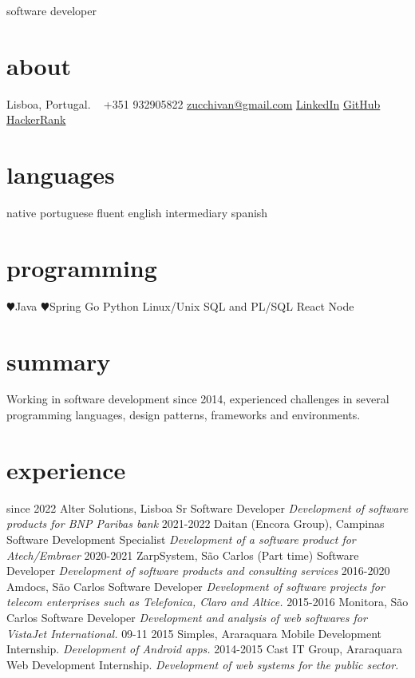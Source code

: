 \documentclass[]{friggeri-cv}
\begin{document}
       {software developer}


\begin{aside}
  \section{about}
    Lisboa,
    Portugal.
    ~
    +351 932905822
    \href{mailto:zucchivan@gmail.com}{zucchivan@gmail.com}
    \faLinkedin \hspace{0pt} \href{http://linkedin.com/zucchivan}{LinkedIn}
    \faGithub \hspace{0pt} \href{https://github.com/zucchivan/}{GitHub}
    \faHackerrank \hspace{0pt} \href{https://www.hackerrank.com/zucchivan}{HackerRank}
  \section{languages}
    native portuguese
    fluent english
    intermediary spanish
  \section{programming}
    {\color{red} $\varheartsuit$}Java
    {\color{red} $\varheartsuit$}Spring
    Go
    Python
    Linux/Unix
    SQL and PL/SQL
    React
    Node
\end{aside}

\section{summary}
    Working in software development since 2014, experienced challenges in several programming languages, design patterns, frameworks and environments. 

\section{experience}
\begin{entrylist}
  \entry
    {since 2022}
    {Alter Solutions, Lisboa}
    {Sr Software Developer}
    {\emph{Development of software products for BNP Paribas bank}}
  \entry
    {2021-2022}
    {Daitan (Encora Group), Campinas}
    {Software Development Specialist}
    {\emph{Development of a software product for Atech/Embraer}}
  \entry
    {2020-2021}
    {ZarpSystem, São Carlos (Part time)}
    {Software Developer}
    {\emph{Development of software products and consulting services}}
  \entry
    {2016-2020}
    {Amdocs, São Carlos}
    {Software Developer}
    {\emph{Development of software projects for telecom enterprises such as Telefonica, Claro and Altice.}}
  \entry
    {2015-2016}
    {Monitora, São Carlos}
    {Software Developer}
    {\emph{Development and analysis of web softwares for VistaJet International.}}
  \entry
    {09-11 2015}
    {Simples, Araraquara}
    {Mobile Development Internship.}
    {\emph{Development of Android apps.}}
  \entry
    {2014-2015}
    {Cast IT Group, Araraquara}
    {Web Development Internship.}
    {\emph{Development of web systems for the public sector.}}


\end{entrylist}
    
\end{document}

